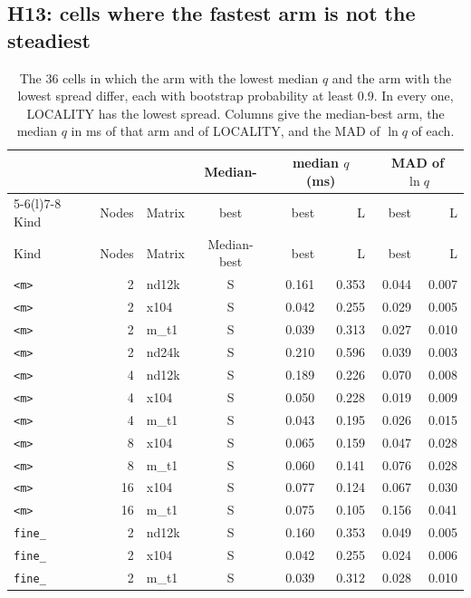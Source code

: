 \documentclass[11pt]{article}
\begin{document}
\subsection{H13: cells where the fastest arm is not the steadiest}

\small
\begin{longtable}{@{}lrlcrrrr@{}}
\caption{The 36 cells in which the arm with the lowest median $q$ and the arm with the
lowest spread differ, each with bootstrap probability at least 0.9. In every one, LOCALITY
has the lowest spread. Columns give the median-best arm, the median $q$ in ms of that arm
and of LOCALITY, and the MAD of $\ln q$ of each.}
\label{tab:app:h13}\\
\toprule
& & & Median- & \multicolumn{2}{c}{median $q$ (ms)} & \multicolumn{2}{c}{MAD of $\ln q$} \\
\cmidrule(lr){5-6}\cmidrule(l){7-8}
Kind & Nodes & Matrix & best & best & L & best & L \\
\midrule
\endfirsthead
\toprule
Kind & Nodes & Matrix & Median-best & best & L & best & L \\
\midrule
\endhead
\texttt{<m>} & 2 & nd12k & S & 0.161 & 0.353 & 0.044 & 0.007 \\
\texttt{<m>} & 2 & x104 & S & 0.042 & 0.255 & 0.029 & 0.005 \\
\texttt{<m>} & 2 & m\_t1 & S & 0.039 & 0.313 & 0.027 & 0.010 \\
\texttt{<m>} & 2 & nd24k & S & 0.210 & 0.596 & 0.039 & 0.003 \\
\texttt{<m>} & 4 & nd12k & S & 0.189 & 0.226 & 0.070 & 0.008 \\
\texttt{<m>} & 4 & x104 & S & 0.050 & 0.228 & 0.019 & 0.009 \\
\texttt{<m>} & 4 & m\_t1 & S & 0.043 & 0.195 & 0.026 & 0.015 \\
\texttt{<m>} & 8 & x104 & S & 0.065 & 0.159 & 0.047 & 0.028 \\
\texttt{<m>} & 8 & m\_t1 & S & 0.060 & 0.141 & 0.076 & 0.028 \\
\texttt{<m>} & 16 & x104 & S & 0.077 & 0.124 & 0.067 & 0.030 \\
\texttt{<m>} & 16 & m\_t1 & S & 0.075 & 0.105 & 0.156 & 0.041 \\
\texttt{fine\_} & 2 & nd12k & S & 0.160 & 0.353 & 0.049 & 0.005 \\
\texttt{fine\_} & 2 & x104 & S & 0.042 & 0.255 & 0.024 & 0.006 \\
\texttt{fine\_} & 2 & m\_t1 & S & 0.039 & 0.312 & 0.028 & 0.010 \\

\end{longtable}
\end{document}
